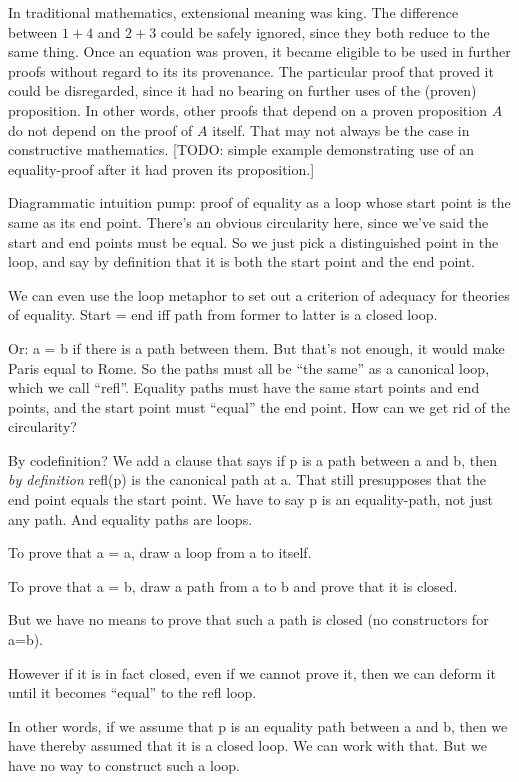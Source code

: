 \documentclass{article}
\begin{document}
In traditional mathematics, extensional meaning was king. The
difference between \(1+4\) and \(2+3\) could be safely ignored, since
they both reduce to the same thing. Once an equation was proven, it
became eligible to be used in further proofs without regard to its its
provenance. The particular proof that proved it could be disregarded,
since it had no bearing on further uses of the (proven) proposition.
In other words, other proofs that depend on a proven proposition \(A\)
do not depend on the proof of \(A\) itself. That may not always be the
case in constructive mathematics. [TODO: simple example demonstrating
  use of an equality-proof after it had proven its proposition.]

Diagrammatic intuition pump: proof of equality as a loop whose start
point is the same as its end point. There's an obvious circularity
here, since we've said the start and end points must be equal. So we
just pick a distinguished point in the loop, and say by definition
that it is both the start point and the end point.

We can even use the loop metaphor to set out a criterion of adequacy
for theories of equality. Start = end iff path from former to latter
is a closed loop.

Or: a = b if there is a path between them. But that's not enough, it
would make Paris equal to Rome. So the paths must all be ``the same''
as a canonical loop, which we call ``refl''. Equality paths must have
the same start points and end points, and the start point must
``equal'' the end point. How can we get rid of the circularity?

By codefinition? We add a clause that says if p is a path between a
and b, then \textit{by definition} refl(p) is the canonical path at a.
That still presupposes that the end point equals the start point. We
have to say p is an equality-path, not just any path. And equality
paths are loops.

To prove that a = a, draw a loop from a to itself.

To prove that a = b, draw a path from a to b and prove that it is closed.

But we have no means to prove that such a path is closed (no
constructors for a=b).

However if it is in fact closed, even if we cannot prove it, then we
can deform it until it becomes ``equal'' to the refl loop.

In other words, if we assume that p is an equality path between a and
b, then we have thereby assumed that it is a closed loop. We can work
with that. But we have no way to construct such a loop.
\end{document}
